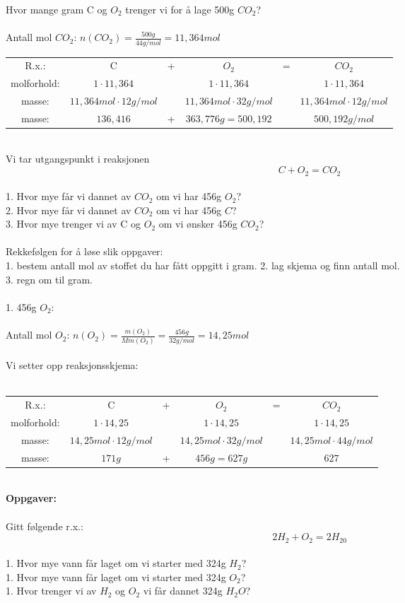 \documentclass[12pt,a4paper]{article}
\begin{document}
\newpage
Hvor mange gram C og $O_2$  trenger vi for å lage 500g $CO_2$?\\\\
Antall mol $CO_2$: $n(CO_2)=\frac{500g}{44g/mol}=11,364mol$ 
\begin{table}[h!]
    \centering
    \begin{tabular}{cccccc}
         R.x.:&  C&  +&  $O_2$&  =& $CO_2$\\
         molforhold:&$1\cdot 11,364$  &  & $1\cdot 11,364$ &  &$1\cdot 11,364$ \\
         masse:&$11,364mol\cdot 12g/mol$&  &$11,364mol\cdot 32g/mol$ &  &$11,364mol\cdot 12g/mol$\\
          masse:&$136,416$& + &$363,776g=500,192$ &  &$500,192g/mol$\\
    \end{tabular}
\end{table}\\
Vi tar utgangspunkt i reaksjonen
$$C+O_2=CO_2$$\\
1. Hvor mye får vi dannet av $CO_2$ om vi har 456g $O_2$?\\
2. Hvor mye får vi dannet av $CO_2$ om vi har 456g $C$?\\
3. Hvor mye trenger vi av C og $O_2$ om vi ønsker 456g $CO_2$?\\\\
Rekkefølgen for å løse slik oppgaver:\\
1. bestem antall mol av stoffet du har fått oppgitt i gram.
2. lag skjema og finn antall mol.\\
3. regn om til gram.\\\\
1. 456g $O_2$:\\\\
Antall mol $O_2$:  $n(O_2)=\frac{m(O_2)}{Mm(O_2)}=\frac{456g}{32g/mol}=14,25mol$\\\\
Vi setter opp reaksjonsskjema:\\\\
\begin{table}[h!]
    \centering
    \begin{tabular}{cccccc}
         R.x.:&  C&  +&  $O_2$&  =& $CO_2$\\
         molforhold:&$1\cdot 14,25$  &  & $1\cdot 14,25$ &  &$1\cdot 14,25$ \\
         masse:&$14,25mol\cdot 12g/mol$&  &$14,25mol\cdot 32g/mol$ &  &$14,25mol\cdot 44g/mol$\\
          masse:&$171g$& + &$456g=627g$ &  &$627$\\
    \end{tabular}
\end{table}\\
\newpage
\noindent\textbf{Oppgaver:}\\\\
Gitt følgende r.x.:
$$2H_2+O_2=2H_20$$\\
1. Hvor mye vann får laget om  vi starter med 324g $H_2$?\\
1. Hvor mye vann får laget om  vi starter med 324g $O_2$?\\
1. Hvor trenger vi av $H_2$ og $O_2$  vi får dannet 324g $H_2O$?\\
\end{document}
